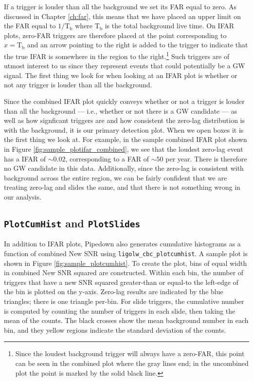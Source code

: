 If a trigger is louder than all the background we set its \ac{FAR} equal to
zero. As discussed in Chapter \ref{ch:far}, this means that we have placed an
upper limit on the \ac{FAR} equal to $1/\mathrm{T_b}$ where $\mathrm{T_b}$ is
the total background live time. On IFAR plots, zero-\ac{FAR} triggers are
therefore placed at the point corresponding to $x=\mathrm{T_b}$ and an arrow
pointing to the right is added to the trigger to indicate that the true IFAR is
somewhere in the region to the right.\footnote{Since the loudest background
trigger will always have a zero-FAR, this point can be seen in the combined
plot where the gray lines end; in the uncombined plot the point is marked by
the solid black line.} Such triggers are of utmost interest to us since they
represent events that could potentially be a \ac{GW} signal. The first thing we
look for when looking at an IFAR plot is whether or not any trigger is louder
than all the background.

Since the combined IFAR plot quickly conveys whether or not a trigger is louder
than all the background --- i.e., whether or not there is a \ac{GW} candidate
--- as well as how signficant triggers are and how consistent the zero-lag
distribution is with the background, it is our primary detection plot. When we
open boxes it is the first thing we look at. For example, in the sample
combined IFAR plot shown in Figure \ref{fig:sample_plotifar_combined}, we see
that the loudest zero-lag event has a IFAR of $\sim0.02$, corresponding to a
\ac{FAR} of $\sim50$ per year. There is therefore no \ac{GW} candidate in this
data. Additionally, since the zero-lag is consistent with background across the
entire region, we can be fairly confident that we are treating zero-lag and
slides the same, and that there is not something wrong in our analysis.

\subsection{\texttt{PlotCumHist} and \texttt{PlotSlides}}
\label{sec:plotcumhist-plotslides}

In addition to IFAR plots, Pipedown also generates cumulative histograms as a
function of combined New \ac{SNR} using \verb|ligolw_cbc_plotcumhist|. A sample
plot is shown in Figure \ref{fig:sample_plotcumhist}. To create the plot, bins
of equal width in combined New \ac{SNR} squared are constructed. Within each bin, the
number of triggers that have a new \ac{SNR} squared greater-than or equal-to
the left-edge of the bin is plotted on the y-axis. Zero-lag results are
indicated by the blue triangles; there is one triangle per-bin. For slide
triggers, the cumulative number is computed by counting the number of triggers
in each slide, then taking the mean of the counts. The black crosses show the
mean background number in each bin, and they yellow regions indicate the
standard deviation of the counts. 

